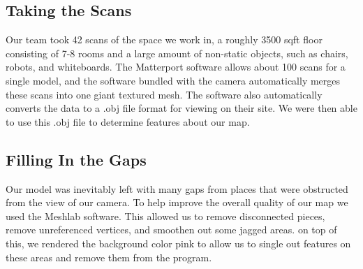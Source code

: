 \documentclass[a4paper,11pt]{article}
\begin{document}
  \subsection{Taking the Scans}
 Our team took 42 scans of the space we work in, a roughly 3500 sqft floor consisting of 7-8 rooms and a large amount of non-static objects, such as chairs, robots, and whiteboards. The Matterport software allows about 100 scans for a single model, and the software bundled with the camera automatically merges these scans into one giant textured mesh. The software also automatically converts the data to a .obj file format for viewing on their site. We were then able to use this .obj file to determine features about our map.


  \subsection{Filling In the Gaps}
  Our model was inevitably left with many gaps from places that were obstructed from the view of our camera. To help improve the overall quality of our map we used the Meshlab software. This allowed us to remove disconnected pieces, remove unreferenced vertices, and smoothen out some jagged areas. on top of this, we rendered the background color pink to allow us to single out features on these areas and remove them from the program.
  
\end{document}
